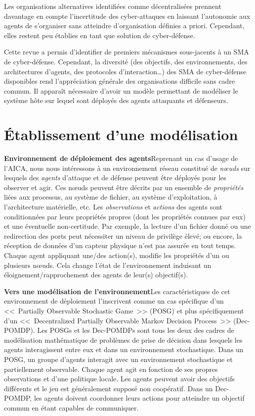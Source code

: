 \documentclass[french]{pfia}
\begin{document}
Les organisations alternatives identifiées comme décentralisées prennent davantage en compte l'incertitude des cyber-attaques en laissant l'autonomie aux agents de s'organiser sans atteindre d'organisation définies a priori. Cependant, elles restent peu établies en tant que solution de cyber-défense.


Cette revue a permis d'identifier de premiers mécanismes sous-jacents à un SMA de cyber-défense. Cependant, la diversité (des objectifs, des environnements, des architectures d'agents, des protocoles d'interaction\dots) des SMA de cyber-défense disponibles rend l'appréciation générale des organisations difficile sans cadre commun.
Il apparaît nécessaire d'avoir un modèle permettant de modéliser le système hôte sur lequel sont déployés des agents attaquants et défenseurs.

\section{Établissement d'une modélisation}

\textbf{Environnement de déploiement des agents}\qquad Reprenant un cas d'usage de l'AICA\cite{theron_autonomous_2021}, nous nous intéressons à un environnement réseau constitué de \textit{nœuds} sur lesquels des \textit{agents} d'attaque et de défense peuvent être déployés pour les observer et agir. Ces nœuds peuvent être décrits par un ensemble de \textit{propriétés} liées aux processus, au système de fichier, au système d'exploitation, à l'architecture matérielle, etc.
Les \textit{observations} et \textit{actions} des agents sont conditionnées par leurs propriétés propres (dont les propriétés connues par eux) et une éventuelle non-certitude. Par exemple, la lecture d'un fichier donné ou une redirection des ports peut nécessiter un niveau de privilège élevé; ou encore, la réception de données d'un capteur physique n'est pas assurée en tout temps.
Chaque agent appliquant une/des action(s), modifie les propriétés d'un ou plusieurs nœuds. Cela change l'état de l'environnement induisant un éloignement/rapprochement des agents de leur(s) objectif(s).

\textbf{Vers une modélisation de l'environnement}\quad Les caractéristiques de cet environnement de déploiement l'inscrivent comme un cas spécifique d'un <<~Partially Observable Stochastic Game~>> (POSG) et plus spécifiquement d'un <<~Decentralized Partially Observable Markov Decision Process~>> (Dec-POMDP).
Les POSGs et les Dec-POMDPs sont tous les deux des cadres de modélisation mathématique de problèmes de prise de décision dans lesquels les agents interagissent entre eux et dans un environnement stochastique\cite{beynier2010}. Dans un POSG, un groupe d'agents interagit avec un environnement stochastique et partiellement observable. Chaque agent agit en fonction de ses propres observations et d'une politique locale. Les agents peuvent avoir des objectifs différents et le jeu est généralement supposé non coopératif\cite{jk2020}.
Dans un Dec-POMDP, les agents doivent coordonner leurs actions pour atteindre un objectif commun en étant capables de communiquer\cite{bernstein2013}.
\end{document}
